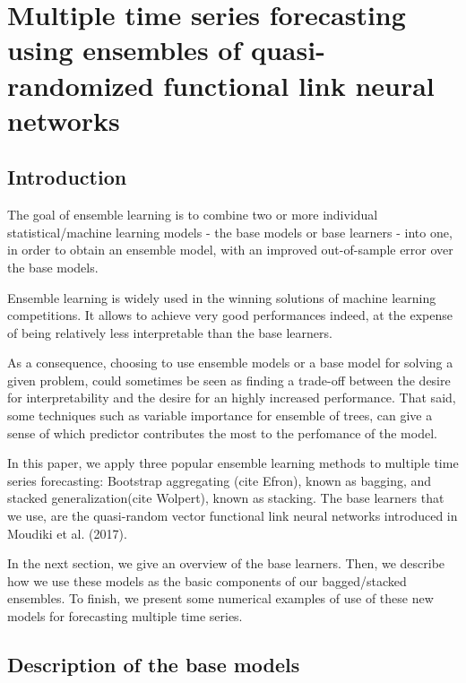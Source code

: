 %
\chapter{Multiple time series forecasting using ensembles of quasi-randomized functional link neural networks}
\label{sec:rvfl_ensembles}

\section{Introduction}

The goal of ensemble learning is to combine two or more individual statistical/machine learning models - the base models or base learners - into one, in order to obtain an ensemble model, with an improved out-of-sample error over the base models.

\medskip

Ensemble learning is widely used in the winning solutions of machine learning competitions. It allows to achieve very good performances indeed, at the expense of being relatively less interpretable than the base learners.

\medskip

As a consequence, choosing to use ensemble models or a base model for solving a given problem, could sometimes be seen as finding a trade-off between the desire for interpretability and the desire for an highly increased performance. That said, some techniques such as variable importance for ensemble of trees, can give a sense of which predictor contributes the most to the perfomance of the model.

\medskip

In this paper, we apply three popular ensemble learning methods to multiple time series forecasting: Bootstrap aggregating (cite Efron), known as bagging, and stacked generalization(cite Wolpert), known as stacking. The base learners that we use, are the quasi-random vector functional link neural networks introduced in Moudiki et al. (2017).

\medskip

In the next section, we give an overview of the base learners. Then, we describe how we use these models as the basic components of our bagged/stacked ensembles. To finish, we present some numerical examples of use of these new models for forecasting multiple time series.

\section{Description of the base models}
\label{sec:basemodeldesc}

